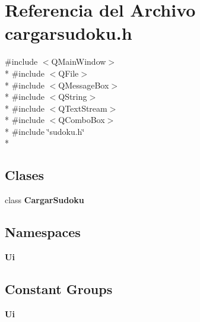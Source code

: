 \section{Referencia del Archivo cargarsudoku.\-h}
\label{cargarsudoku_8h}
{\ttfamily \#include $<$Q\-Main\-Window$>$}\\*
{\ttfamily \#include $<$Q\-File$>$}\\*
{\ttfamily \#include $<$Q\-Message\-Box$>$}\\*
{\ttfamily \#include $<$Q\-String$>$}\\*
{\ttfamily \#include $<$Q\-Text\-Stream$>$}\\*
{\ttfamily \#include $<$Q\-Combo\-Box$>$}\\*
{\ttfamily \#include \char`\"{}sudoku.\-h\char`\"{}}\\*
\subsection*{Clases}
\begin{DoxyCompactItemize}
\item 
class {\bf Cargar\-Sudoku}
\end{DoxyCompactItemize}
\subsection*{Namespaces}
\begin{DoxyCompactItemize}
\item 
{\bf Ui}
\end{DoxyCompactItemize}
\subsection*{Constant Groups}
\begin{DoxyCompactItemize}
\item 
{\bf Ui}
\end{DoxyCompactItemize}
